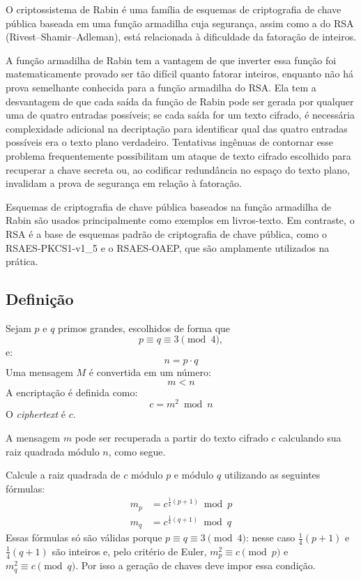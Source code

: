 O criptossistema de Rabin é uma família de esquemas de criptografia de chave
pública baseada em uma função armadilha cuja segurança, assim como a do RSA (Rivest--Shamir--Adleman),
está relacionada à dificuldade da fatoração de inteiros.

A função armadilha de Rabin tem a vantagem de que inverter essa função foi
matematicamente provado ser tão difícil quanto fatorar inteiros, enquanto não
há prova semelhante conhecida para a função armadilha do RSA. Ela tem a
desvantagem de que cada saída da função de Rabin pode ser gerada por qualquer
uma de quatro entradas possíveis; se cada saída for um texto cifrado, é
necessária complexidade adicional na decriptação para identificar qual das
quatro entradas possíveis era o texto plano verdadeiro. Tentativas ingênuas de
contornar esse problema frequentemente possibilitam um ataque de texto cifrado
escolhido para recuperar a chave secreta ou, ao codificar redundância no
espaço do texto plano, invalidam a prova de segurança em relação à fatoração.

Esquemas de criptografia de chave pública baseados na função armadilha de
Rabin são usados principalmente como exemplos em livros-texto. Em contraste, o
RSA é a base de esquemas padrão de criptografia de chave pública, como o
RSAES-PKCS1-v1\_5 e o RSAES-OAEP, que são amplamente utilizados na prática.
\cite{rabin2005}

\subsection{Definição}

Sejam $p$ e $q$ primos grandes, escolhidos de forma que
\[
p \equiv q \equiv 3 \pmod{4},
\]
e:
\[
n = p \cdot q
\]
Uma mensagem $M$ é convertida em um número:
\[
m < n
\]
A encriptação é definida como:
\[
c = m^2 \bmod n
\]
O \emph{ciphertext} é $c$.

A mensagem $m$ pode ser recuperada a partir do texto cifrado $c$ calculando
sua raiz quadrada módulo $n$, como segue.

Calcule a raiz quadrada de $c$ módulo $p$ e módulo $q$ utilizando as
seguintes fórmulas:
\begin{align*}
m_p &= c^{\frac{1}{4}(p+1)} \bmod p \\
m_q &= c^{\frac{1}{4}(q+1)} \bmod q
\end{align*}
Essas fórmulas só são válidas porque $p \equiv q \equiv 3 \pmod 4$: nesse
caso $\frac{1}{4}(p+1)$ e $\frac{1}{4}(q+1)$ são inteiros e, pelo critério de
Euler, $m_p^2 \equiv c \pmod p$ e $m_q^2 \equiv c \pmod q$. Por isso a geração
de chaves deve impor essa condição.

